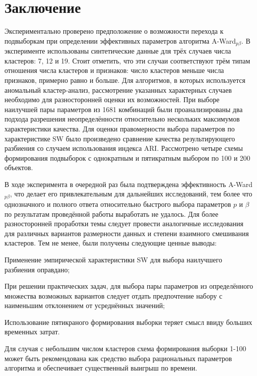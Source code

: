 \documentclass[12pt]{a&t}
\begin{document}
\section{Заключение}

Экспериментально проверено предположение о возможности перехода к подвыборкам при определении эффективных параметров алгоритма \mbox{A-Ward$ _{p\beta} $}. В эксперименте использованы синтетические данные для трёх случаев числа кластеров: 7, 12 и 19. Стоит отметить, что эти случаи соответствуют трём типам отношения числа кластеров и признаков: число кластеров меньше числа признаков, примерно равно и больше. Для алгоритмов, в которых используется аномальный кластер-анализ, рассмотрение указанных характерных случаев необходимо для разносторонней оценки их возможностей. При выборе наилучшей пары параметров из 1681 комбинаций были проанализированы два подхода разрешения неопределённости относительно нескольких максимумов характеристики качества. Для оценки правомерности выбора параметров по характеристике SW было произведено сравнение качества результирующего разбиения со случаем использования индекса ARI. Рассмотрено четыре схемы формирования подвыборок с однократным и пятикратным выбором по 100 и 200 объектов.

В ходе эксперимента в очередной раз была подтверждена эффективность \mbox{A-Ward$ _{p\beta} $}, что делает его привлекательным для дальнейших исследований, тем более что однозначного и полного ответа относительно быстрого выбора параметров $ p $ и $ \beta $ по результатам проведённой работы выработать не удалось. Для более разносторонней проработки темы следует провести аналогичные исследования для различных вариантов размерности данных и степени взаимного смешивания кластеров. Тем не менее, были получены следующие ценные выводы:

\begin{enumlist} 
	\item
	Применение эмпирической характеристики SW для выбора наилучшего разбиения оправдано;
	\item
	При решении практических задач, для выбора пары параметров из определённого множества возможных вариантов следует отдать предпочтение набору с наименьшим отклонением от усреднённых значений;
	\item
	Использование пятикраного формирования выборки теряет смысл ввиду больших временных затрат.
	\item
	Для случая с небольшим числом кластеров схема формирования выборки 1-100 может быть рекомендована как средство выбора рациональных параметров алгоритма и обеспечивает существенный выигрыш по времени.
\end{enumlist}
\end{document}
